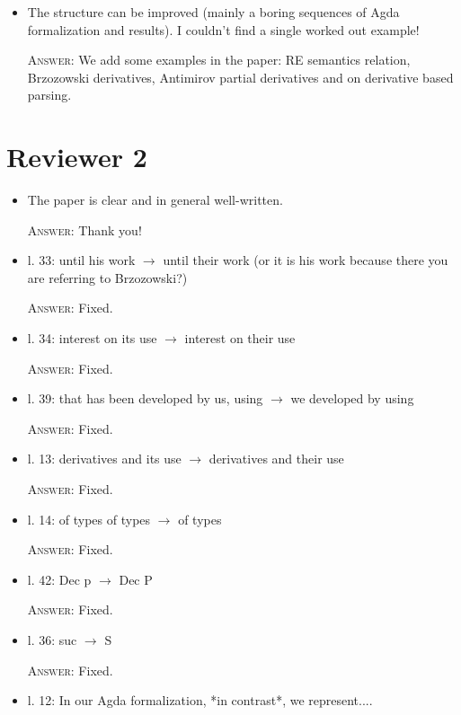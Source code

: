\documentclass{article}
\begin{document}
\begin{itemize}
     \item The structure can be improved (mainly a boring sequences of Agda formalization and results).
           I couldn't find a single worked out example!
           
     \textsc{Answer}: We add some examples in the paper: RE semantics relation, Brzozowski derivatives,
     Antimirov partial derivatives and on derivative based parsing.
\end{itemize}

\section*{Reviewer 2}

\begin{itemize}
    \item The paper is clear and in general well-written. 
    
    \textsc{Answer}: Thank you!
    
    \item l. 33: until his work $\to$ until their work (or it is his work because there you are referring to Brzozowski?)
    
    \textsc{Answer:} Fixed.
    
    \item l. 34: interest on its use $\to$ interest on their use

    \textsc{Answer}: Fixed.
    
    \item l. 39: that has been developed by us, using $\to$ we developed by using

    \textsc{Answer}: Fixed.

    \item l. 13: derivatives and its use $\to$ derivatives and their use

    \textsc{Answer}: Fixed.

    \item l. 14: of types of types $\to$ of types

    \textsc{Answer}: Fixed.

    \item l. 42: Dec p $\to$ Dec P

    \textsc{Answer}: Fixed.

    \item l. 36: suc $\to$ S

    \textsc{Answer}: Fixed.

    \item l. 12: In our Agda formalization, *in contrast*, we represent....


\end{itemize}
\end{document}
